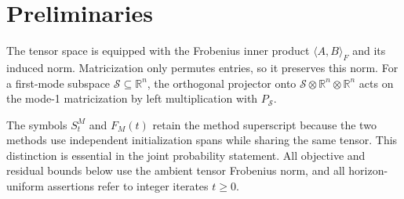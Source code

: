 \section{Preliminaries}

The tensor space is equipped with the Frobenius inner product
$\langle A,B\rangle_F$ and its induced norm.  Matricization only permutes
entries, so it preserves this norm.  For a first-mode subspace
$\mathcal S\subseteq\mathbb R^n$, the orthogonal projector onto
$\mathcal S\otimes\mathbb R^n\otimes\mathbb R^n$ acts on the mode-1
matricization by left multiplication with $P_{\mathcal S}$.

The symbols $S_t^M$ and $F_M(t)$ retain the method superscript because the two
methods use independent initialization spans while sharing the same tensor.
This distinction is essential in the joint probability statement.  All
objective and residual bounds below use the ambient tensor Frobenius norm, and
all horizon-uniform assertions refer to integer iterates $t\ge0$.
